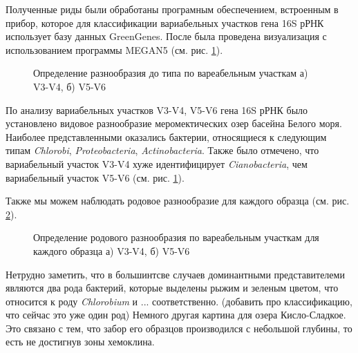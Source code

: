 Полученные риды были обработаны програмным обеспечением, встроенным в прибор, которое для классификации вариабельных участков гена 16S рРНК использует базу данных GreenGenes. После была проведена визуализация с использованием программы MEGAN5 (см. рис. \ref{ris:V3-V4, V5-V6}). 

\begin{figure}[h]
\begin{minipage}[h]{0.5\linewidth}
\end{minipage}
\hfill
\begin{minipage}[h]{0.5\linewidth}
\end{minipage}
\caption{Определение разнообразия до типа по вареабельным участкам а) V3-V4, б) V5-V6}
\label{ris:V3-V4, V5-V6}
\end{figure}

По анализу вариабельных участков V3-V4, V5-V6 гена 16S рРНК было установлено видовое разнообразие меромектических озер басейна Белого моря. Наиболее представленными оказались бактерии, относящиеся к следующим типам \textit{Chlorobi}, \textit{Proteobacteria}, \textit{Actinobacteria}.  Также было отмечено, что вариабельный участок V3-V4 хуже идентифицирует \textit{Cianobacteria}, чем вариабельный участок V5-V6   (см. рис. \ref{ris:V3-V4, V5-V6}). 

Также мы можем наблюдать родовое разнообразие для каждого образца (см. рис. \ref{ris:taxonomy_V3-V4, V5-V6}).

\begin{figure}[h]
\begin{minipage}[h]{0.5\linewidth}
\end{minipage}
\hfill
\begin{minipage}[h]{0.5\linewidth}
\end{minipage}
\caption{Определение родового разнообразия по вареабельным участкам для каждого образца а) V3-V4, б) V5-V6}
\label{ris:taxonomy_V3-V4, V5-V6}
\end{figure}

Нетрудно заметить, что в большинтсве случаев доминантными представителеми являются два рода бактерий, которые выделены рыжим и зеленым цветом, что относится к роду \textit{Chlorobium} и ... соответственно. (добавить про классификацию, что сейчас это уже один род) Немного другая картина для озера Кисло-Сладкое. Это связано с тем, что забор его образцов производился с небольшой глубины, то есть не достигнув зоны хемоклина. 
  
